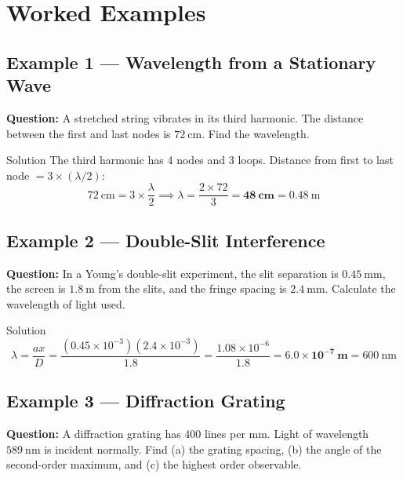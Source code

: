 \pagebreak


\section{Worked Examples}

\subsection*{Example 1 --- Wavelength from a Stationary Wave}

\textbf{Question:} A stretched string vibrates in its third harmonic. The distance between the first and last nodes is $72\ \text{cm}$. Find the wavelength.

\begin{examplebox}{Solution}
The third harmonic has 4 nodes and 3 loops. Distance from first to last node $= 3 \times (\lambda/2)$:
$$72\ \text{cm} = 3 \times \frac{\lambda}{2} \implies \lambda = \frac{2 \times 72}{3} = \mathbf{48\ \text{cm}} = 0.48\ \text{m}$$
\end{examplebox}

\subsection*{Example 2 --- Double-Slit Interference}

\textbf{Question:} In a Young's double-slit experiment, the slit separation is $0.45\ \text{mm}$, the screen is $1.8\ \text{m}$ from the slits, and the fringe spacing is $2.4\ \text{mm}$. Calculate the wavelength of light used.

\begin{examplebox}{Solution}
$$\lambda = \frac{ax}{D} = \frac{(0.45\times10^{-3})(2.4\times10^{-3})}{1.8}
= \frac{1.08\times10^{-6}}{1.8} = \mathbf{6.0\times10^{-7}\ \text{m}} = 600\ \text{nm}$$
\end{examplebox}

\subsection*{Example 3 --- Diffraction Grating}

\textbf{Question:} A diffraction grating has $400$ lines per mm. Light of wavelength $589\ \text{nm}$ is incident normally. Find (a) the grating spacing, (b) the angle of the second-order maximum, and (c) the highest order observable.

